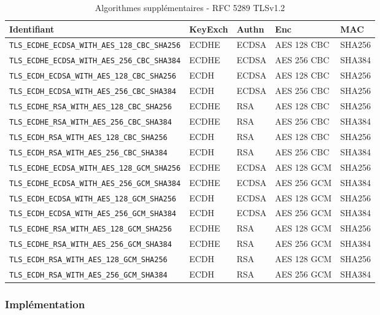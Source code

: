 \begin{table}[H]
\centering
\begin{tabularx}{17cm}{|l|l|l|X|l|}
\hline
\textbf{Identifiant} & \textbf{KeyExch} & \textbf{Authn}& \textbf{Enc}& \textbf{MAC}\\
\hline
\verb+TLS_ECDHE_ECDSA_WITH_AES_128_CBC_SHA256+&ECDHE&ECDSA&AES 128 CBC&SHA256\\
\hline
\verb+TLS_ECDHE_ECDSA_WITH_AES_256_CBC_SHA384+&ECDHE&ECDSA&AES 256 CBC&SHA384\\
\hline
\verb+TLS_ECDH_ECDSA_WITH_AES_128_CBC_SHA256+&ECDH&ECDSA&AES 128 CBC&SHA256\\
\hline
\verb+TLS_ECDH_ECDSA_WITH_AES_256_CBC_SHA384+&ECDH&ECDSA&AES 256 CBC&SHA256\\
\hline
\verb+TLS_ECDHE_RSA_WITH_AES_128_CBC_SHA256+&ECDHE&RSA&AES 128 CBC&SHA256\\
\hline
\verb+TLS_ECDHE_RSA_WITH_AES_256_CBC_SHA384+&ECDHE&RSA&AES 256 CBC&SHA384\\
\hline
\verb+TLS_ECDH_RSA_WITH_AES_128_CBC_SHA256+&ECDH&RSA&AES 128 CBC&SHA256\\
\hline
\verb+TLS_ECDH_RSA_WITH_AES_256_CBC_SHA384+&ECDH&RSA&AES 256 CBC&SHA384\\
\hline
\verb+TLS_ECDHE_ECDSA_WITH_AES_128_GCM_SHA256+&ECDHE&ECDSA&AES 128 GCM&SHA256\\
\hline
\verb+TLS_ECDHE_ECDSA_WITH_AES_256_GCM_SHA384+&ECDHE&ECDSA&AES 256 GCM&SHA384\\
\hline
\verb+TLS_ECDH_ECDSA_WITH_AES_128_GCM_SHA256+&ECDH&ECDSA&AES 128 GCM&SHA256\\
\hline
\verb+TLS_ECDH_ECDSA_WITH_AES_256_GCM_SHA384+&ECDH&ECDSA&AES 256 GCM&SHA384\\
\hline
\verb+TLS_ECDHE_RSA_WITH_AES_128_GCM_SHA256+&ECDHE&RSA&AES 128 GCM&SHA256\\
\hline
\verb+TLS_ECDHE_RSA_WITH_AES_256_GCM_SHA384+&ECDHE&RSA&AES 256 GCM&SHA384\\
\hline
\verb+TLS_ECDH_RSA_WITH_AES_128_GCM_SHA256+&ECDH&RSA&AES 128 GCM&SHA256\\
\hline
\verb+TLS_ECDH_RSA_WITH_AES_256_GCM_SHA384+&ECDH&RSA&AES 256 GCM&SHA384\\
\hline
\end{tabularx}
\caption{Algorithmes supplémentaires - RFC 5289 TLSv1.2}
\label{algosTLSRFCv1.2}
\end{table}


\subsubsection{Implémentation}

